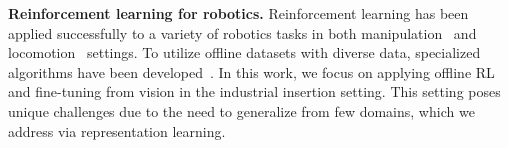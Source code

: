 \documentclass[letterpaper, 10 pt, conference, final]{ieeeconf}   %
\begin{document}
\textbf{Reinforcement learning for robotics.}
Reinforcement learning has been applied successfully to a variety of robotics tasks in both manipulation~\cite{peters2008baseball, kober2008mp,deisenroth2011pilco, levine2016gps, levine2017grasping} and locomotion~\cite{giusti15trails, nakanishi2004bipedlfd, kalakrishnan09terraintemplates} settings.
To utilize offline datasets with diverse data, specialized algorithms have been developed~\cite{chebotar2021actionable, kalashnikov2021mtopt, nair2020awac}.
In this work, we focus on applying offline RL and fine-tuning from vision in the industrial insertion setting.
This setting poses unique challenges due to the need to generalize from few domains, which we address via representation learning.
\end{document}
